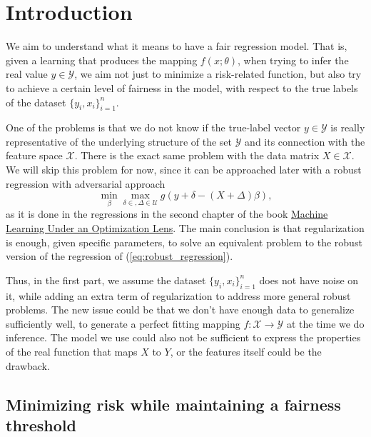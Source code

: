 \documentclass{article}
\newcommand{\Y}{\mathcal{Y}}
\newcommand{\X}{\mathcal{X}}
\newcommand{\U}{\mathcal{U}}
\begin{document}




\newpage
\section{Introduction}

We aim to understand what it means to have a fair regression model. That is, given a learning that produces the mapping $f(x;\theta)$, when trying to infer the real value $y\in \Y$, we aim not just to minimize a risk-related function, but also try to achieve a certain level of fairness in the model, with respect to the true labels of the dataset $\{y_i,x_i\}_{i=1}^n$. 

One of the problems is that we do not know if the true-label vector $y \in \Y$ is really representative of the underlying structure of the set $\Y$ and its connection with the feature space $\X$. There is the exact same problem with the data matrix $X\in \X$. We will skip this problem for now, since it can be approached later with a robust regression with adversarial approach 
\begin{equation}
    \label{eq:robust_regression}
    \min_{\beta}\max_{\delta \in , \Delta \in \U} g(y+\delta-(X+\Delta)\beta),
\end{equation}
as it is done in the regressions in the second chapter of the book \href{https://www.dynamic-ideas.com/books/machine-learning-under-a-modern-optimization-lens}{Machine Learning Under an Optimization Lens}. The main conclusion is that regularization is enough, given specific parameters, to solve an equivalent problem to the robust version of the regression of (\ref{eq:robust_regression}).

Thus, in the first part, we assume the dataset $\{y_i,x_i\}_{i=1}^n$ does not have noise on it, while adding an extra term of regularization to address more general robust problems. The new issue could be that we don't have enough data to generalize sufficiently well, to generate a perfect fitting mapping $f:\X\rightarrow \Y$ at the time we do inference. The model we use could also not be sufficient to express the properties of the real function that maps $X$ to $Y$, or the features itself could be the drawback.

\subsection{Minimizing risk while maintaining a fairness threshold}
\end{document}
